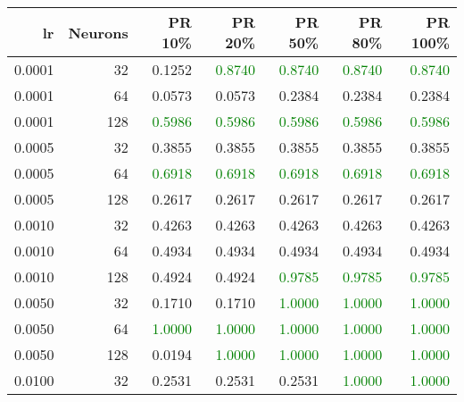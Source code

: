 \begin{tabular}{rrrrrrr}
\toprule
lr & Neurons & PR 10\% & PR 20\% & PR 50\% & PR 80\% & PR 100\% \\
\midrule
0.0001 & 32 & \textcolor{blu} {0.1252} & \textcolor{green} {0.8740} & \textcolor{green} {0.8740} & \textcolor{green} {0.8740} & \textcolor{green} {0.8740} \\
0.0001 & 64 & \textcolor{blu} {0.0573} & \textcolor{blu} {0.0573} & \textcolor{blu} {0.2384} & \textcolor{blu} {0.2384} & \textcolor{blu} {0.2384} \\
0.0001 & 128 & \textcolor{green} {0.5986} & \textcolor{green} {0.5986} & \textcolor{green} {0.5986} & \textcolor{green} {0.5986} & \textcolor{green} {0.5986} \\
0.0005 & 32 & \textcolor{blu} {0.3855} & \textcolor{blu} {0.3855} & \textcolor{blu} {0.3855} & \textcolor{blu} {0.3855} & \textcolor{blu} {0.3855} \\
0.0005 & 64 & \textcolor{green} {0.6918} & \textcolor{green} {0.6918} & \textcolor{green} {0.6918} & \textcolor{green} {0.6918} & \textcolor{green} {0.6918} \\
0.0005 & 128 & \textcolor{blu} {0.2617} & \textcolor{blu} {0.2617} & \textcolor{blu} {0.2617} & \textcolor{blu} {0.2617} & \textcolor{blu} {0.2617} \\
0.0010 & 32 & \textcolor{blu} {0.4263} & \textcolor{blu} {0.4263} & \textcolor{blu} {0.4263} & \textcolor{blu} {0.4263} & \textcolor{blu} {0.4263} \\
0.0010 & 64 & \textcolor{blu} {0.4934} & \textcolor{blu} {0.4934} & \textcolor{blu} {0.4934} & \textcolor{blu} {0.4934} & \textcolor{blu} {0.4934} \\
0.0010 & 128 & \textcolor{blu} {0.4924} & \textcolor{blu} {0.4924} & \textcolor{green} {0.9785} & \textcolor{green} {0.9785} & \textcolor{green} {0.9785} \\
0.0050 & 32 & \textcolor{blu} {0.1710} & \textcolor{blu} {0.1710} & \textcolor{green} {1.0000} & \textcolor{green} {1.0000} & \textcolor{green} {1.0000} \\
0.0050 & 64 & \textcolor{green} {1.0000} & \textcolor{green} {1.0000} & \textcolor{green} {1.0000} & \textcolor{green} {1.0000} & \textcolor{green} {1.0000} \\
0.0050 & 128 & \textcolor{blu} {0.0194} & \textcolor{green} {1.0000} & \textcolor{green} {1.0000} & \textcolor{green} {1.0000} & \textcolor{green} {1.0000} \\
0.0100 & 32 & \textcolor{blu} {0.2531} & \textcolor{blu} {0.2531} & \textcolor{blu} {0.2531} & \textcolor{green} {1.0000} & \textcolor{green} {1.0000} \\

\end{tabular}
